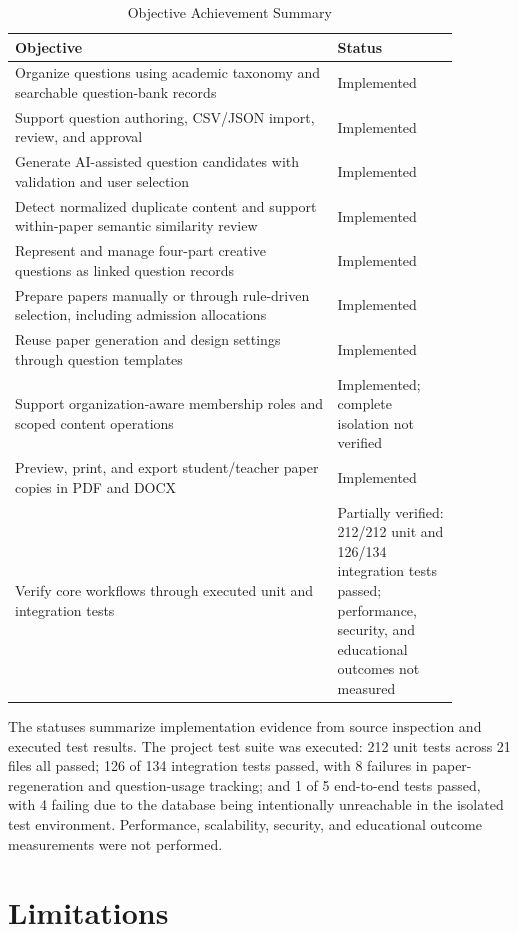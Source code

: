 \begin{table}[H]
\centering
\caption{Objective Achievement Summary}
\label{tab:objective-achievement}
\begin{tabular}{|p{0.64\linewidth}|p{0.24\linewidth}|}
\hline
\textbf{Objective} & \textbf{Status} \\
\hline
Organize questions using academic taxonomy and searchable question-bank records & Implemented \\
\hline
Support question authoring, CSV/JSON import, review, and approval & Implemented \\
\hline
Generate AI-assisted question candidates with validation and user selection & Implemented \\
\hline
Detect normalized duplicate content and support within-paper semantic similarity review & Implemented \\
\hline
Represent and manage four-part creative questions as linked question records & Implemented \\
\hline
Prepare papers manually or through rule-driven selection, including admission allocations & Implemented \\
\hline
Reuse paper generation and design settings through question templates & Implemented \\
\hline
Support organization-aware membership roles and scoped content operations & Implemented; complete isolation not verified \\
\hline
Preview, print, and export student/teacher paper copies in PDF and DOCX & Implemented \\
\hline
Verify core workflows through executed unit and integration tests & Partially verified: 212/212 unit and 126/134 integration tests passed; performance, security, and educational outcomes not measured \\
\hline
\end{tabular}
\end{table}

The statuses summarize implementation evidence from source inspection and executed test results. The project test suite was executed: 212 unit tests across 21 files all passed; 126 of 134 integration tests passed, with 8 failures in paper-regeneration and question-usage tracking; and 1 of 5 end-to-end tests passed, with 4 failing due to the database being intentionally unreachable in the isolated test environment. Performance, scalability, security, and educational outcome measurements were not performed.

\section{Limitations}

